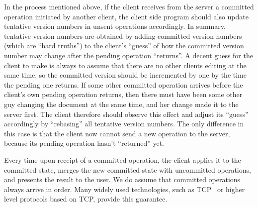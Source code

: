 In the process mentioned above, if the client receives from the server a
committed operation initiated by another client, the client side program should
also update tentative version numbers in unsent operations accordingly. In
summary, tentative version numbers are obtained by adding committed version
numbers (which are ``hard truths'') to the client's ``guess'' of how the
committed version number may change after the pending operation ``returns''. A
decent guess for the client to make is always to assume that there are no other
clients editing at the same time, so the committed version should be incremented
by one by the time the pending one returns. If some other committed operation
arrives before the client's own pending operation returns, then there must have
been some other guy changing the document at the same time, and her change made
it to the server first. The client therefore should observe this effect and
adjust its ``guess'' accordingly by ``rebasing'' all tentative version numbers.
The only difference in this case is that the client now cannot send a new
operation to the server, because its pending operation hasn't ``returned'' yet.

Every time upon receipt of a committed operation, the client applies it to the
committed state, merges the new committed state with uncommitted operations, and
presents the result to the user. We do assume that committed operations always
arrive in order. Many widely used technologies, such as TCP~\cite{tcp} or higher
level protocols based on TCP, provide this guarantee.
